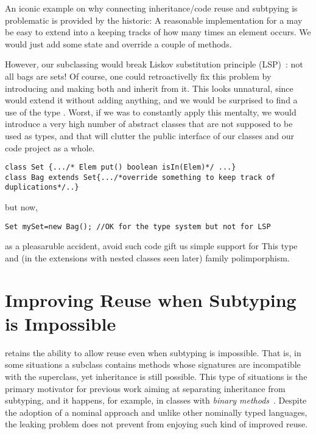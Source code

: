 An iconic example on why connecting inheritance/code reuse and
subtpying is problematic is provided by the
historic\cite{LaLonde:1991:SSS:110673.110679}: A reasonable
implementation for a \Q@Set@ may be easy to extend into a \Q@Bag@
keeping tracks of how many times an element occurs.  We would just add
some state and override a couple of methods.

However, our subclassing would break Liskov substitution principle (LSP)~\cite{martin2000design}: not all bags are sets!
Of course, one could retroactivelly fix this problem by introducing \Q@AbstractSetOrBag@
and making both \Q@Bag@ and \Q@Set@ inherit from it.
This looks unnatural, since \Q@Set@ would extend it without adding anything,
and we would be surprised to find a use of the type \Q@AbstractSetOrBag@.
Worst, if we was to constantly apply this mentalty, we would introduce a very high number
of abstract classes that are not supposed to be used as types, and that will clutter the 
public interface of our classes and our code project as a whole.

\begin{lstlisting}
class Set {.../* Elem put() boolean isIn(Elem)*/ ...}
class Bag extends Set{.../*override something to keep track of duplications*/..}
\end{lstlisting}

but now, 

\begin{lstlisting}
Set mySet=new Bag(); //OK for the type system but not for LSP
\end{lstlisting}

as a pleasaruble accident, avoid such code gift us simple support for
This type and (in the extensions with nested classes seen later)
family polimporphism.

\section{Improving Reuse when Subtyping is Impossible}

\name retains the ability to allow reuse even when subtyping is
impossible. That is, in some situations a subclass contains methods
whose signatures are incompatible with the superclass, yet inheritance
is still possible. This type of situations is the primary motivator
for previous work aiming at separating inheritance from subtyping, and
it happens, for example, in classes with \emph{binary
  methods}~\cite{}.  Despite the adoption of a nominal approach and
unlike other nominally typed languages, the leaking problem does not
prevent \name from enjoying such kind of improved reuse.

